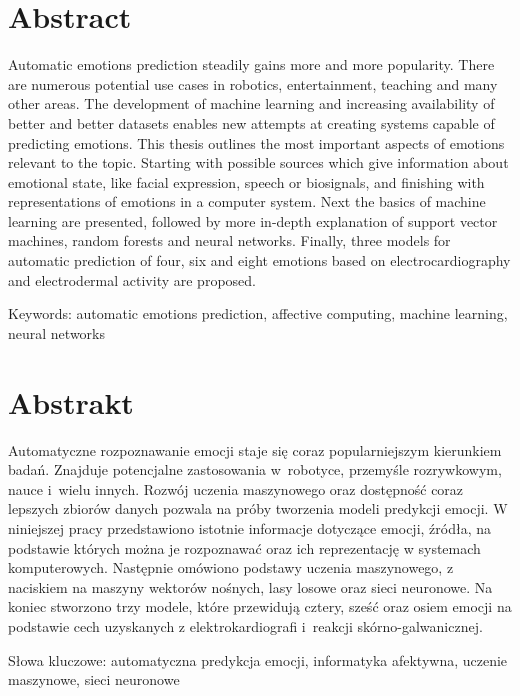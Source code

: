 \section*{Abstract}\label{sec:abstract}

Automatic emotions prediction steadily gains more and more popularity.
There are numerous potential use cases in robotics, entertainment, teaching and many other areas.
The development of machine learning and increasing availability of better and better datasets enables new attempts at creating systems capable of predicting emotions.
This thesis outlines the most important aspects of emotions relevant to the topic.
Starting with possible sources which give information about emotional state, like facial expression, speech or biosignals, and finishing with representations of emotions in a computer system.
Next the basics of machine learning are presented, followed by more in-depth explanation of support vector machines, random forests and neural networks.
Finally, three models for automatic prediction of four, six and eight emotions based on electrocardiography and electrodermal activity are proposed.

Keywords: automatic emotions prediction, affective computing, machine learning, neural networks

\section*{Abstrakt}\label{sec:abstrakt}

Automatyczne rozpoznawanie emocji staje się coraz popularniejszym kierunkiem badań.
Znajduje potencjalne zastosowania w~robotyce, przemyśle rozrywkowym, nauce i~wielu innych.
Rozwój uczenia maszynowego oraz dostępność coraz lepszych zbiorów danych pozwala na próby tworzenia modeli predykcji emocji.
W niniejszej pracy przedstawiono istotnie informacje dotyczące emocji, źródła, na podstawie których można je rozpoznawać oraz ich reprezentację w systemach komputerowych.
Następnie omówiono podstawy uczenia maszynowego, z naciskiem na maszyny wektorów nośnych, lasy losowe oraz sieci neuronowe.
Na koniec stworzono trzy modele, które przewidują cztery, sześć oraz osiem emocji na podstawie cech uzyskanych z elektrokardiografi i~reakcji skórno-galwanicznej.

Słowa kluczowe: automatyczna predykcja emocji, informatyka afektywna, uczenie maszynowe, sieci neuronowe
